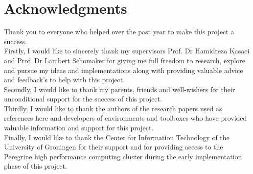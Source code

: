 \thispagestyle{acknowledgements}
\section*{Acknowledgments}

Thank you to everyone who helped over the past year to make this project a success. \\

Firstly, I would like to sincerely thank my supervisors Prof. Dr Hamidreza Kasaei and Prof. Dr Lambert Schomaker for giving me full freedom to research, explore and pursue my ideas and implementations along with providing valuable advice and feedback's to help with this project. \\

Secondly, I would like to thank my parents, friends and well-wishers for their unconditional support for the success of this project. \\

Thirdly, I would like to thank the authors of the research papers used as references here and developers of environments and toolboxes who have provided valuable information and support for this project. \\

Finally, I would like to thank the Center for Information Technology of the University of Groningen for their support and for providing access to the Peregrine high performance computing cluster during the early implementation phase of this project. \\
